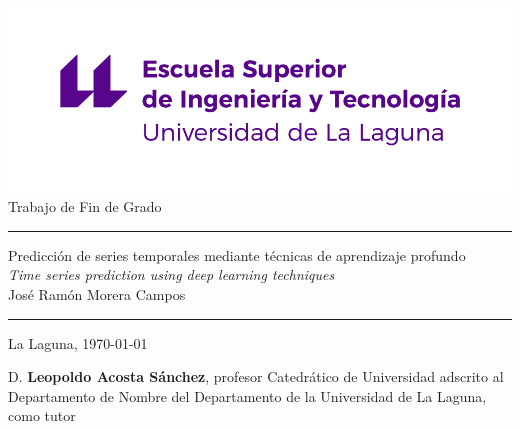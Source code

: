 \documentclass[spanish,a4paper,12pt,oneside]{extreport}
\begin{document}
\renewcommand\listtablename{Índice de Tablas}    
\renewcommand\listfigurename{Índice de Figuras}    

\pagestyle{empty}
\thispagestyle{empty}


\newcommand{\HRule}{\rule{\linewidth}{1mm}}
\setlength{\parindent}{0mm}
\setlength{\parskip}{0mm}


\begin{center}
\includegraphics[scale=0.8]{images/escuela-ingenieria-tecnologia-original}\\[10mm]
{\Huge Trabajo de Fin de Grado}
\end{center}

\HRule
\begin{flushright}
        {\Huge Predicción de series temporales mediante técnicas de aprendizaje profundo } \\[2.5mm]
        {\Large \textit{Time series prediction using deep learning techniques}} \\[5mm]
        {\Large José Ramón Morera Campos} \\[5mm]


\end{flushright}
\HRule
{}
\begin{center}
  \Large La Laguna, \today
\end{center}

\setlength{\parindent}{5mm}

\newpage
\thispagestyle{empty}

D. {\bf Leopoldo Acosta Sánchez}, profesor Catedrático de Universidad adscrito al Departamento de Nombre del Departamento de la Universidad de La Laguna, como tutor
\end{document}
